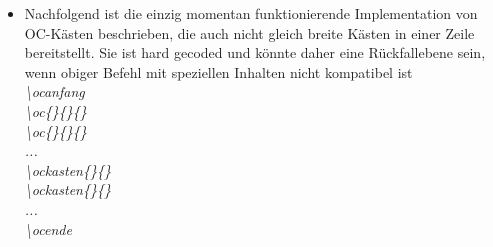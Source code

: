 \documentclass[./main.tex]{subfiles}
\begin{document}
\begin{itemize}
    \item Nachfolgend ist die einzig momentan funktionierende Implementation von OC-K\"asten beschrieben, die auch nicht gleich breite K\"asten in einer Zeile bereitstellt. Sie ist hard gecoded und k\"onnte daher eine R\"uckfallebene sein, wenn obiger Befehl mit speziellen Inhalten nicht kompatibel ist \hypertarget{oc}{} \hypertarget{ocanfang}{} \hypertarget{ocende}{} \hypertarget{ochilf}{} \hypertarget{ockasten}{}\\
    \textit{\textbackslash ocanfang \\\textbackslash oc\{\}\{\}\{\} \\\textbackslash oc\{\}\{\}\{\} \\...\\\textbackslash ockasten\{\}\{\}\\\textbackslash ockasten\{\}\{\}\\...\\\textbackslash ocende}\\

\end{itemize}
\end{document}
